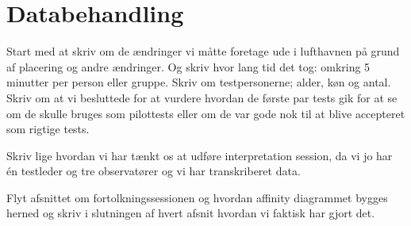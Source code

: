 \chapter{Databehandling}
\label{ParametreDatabehandling}
%
Start med at skriv om de ændringer vi måtte foretage ude i lufthavnen på grund af placering og andre ændringer. Og skriv hvor lang tid det tog: omkring 5 minutter per person eller gruppe. Skriv om testpersonerne; alder, køn og antal. Skriv om at vi besluttede for at vurdere hvordan de første par tests gik for at se om de skulle bruges som pilottests eller om de var gode nok til at blive accepteret som rigtige tests. 


Skriv lige hvordan vi har tænkt os at udføre interpretation session, da vi jo har én testleder og tre observatører og vi har transkriberet data. 

Flyt afsnittet om fortolkningssessionen og hvordan affinity diagrammet bygges herned og skriv i slutningen af hvert afsnit hvordan vi faktisk har gjort det. 